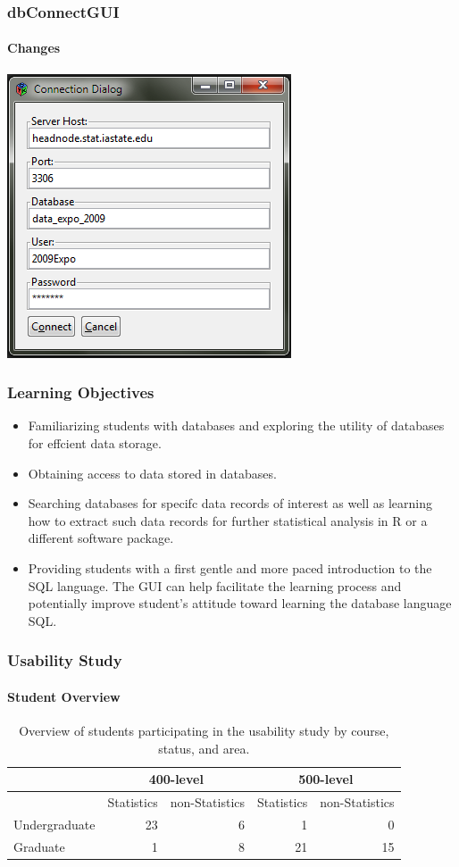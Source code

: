 \documentclass[xcolor=dvipsnames]{beamer}
\begin{document}
\begin{frame}
  \frametitle{dbConnectGUI}
  \framesubtitle{Changes}
  \centering
  \includegraphics[width=.50\linewidth]{./images/db-ConnectNew.png}

\end{frame}

\begin{frame}
  \frametitle{Learning Objectives}
	
	\begin{itemize}
	\item Familiarizing students with databases and exploring the utility of databases for effcient data storage.
	\item Obtaining access to data stored in databases.
	\item Searching databases for specifc data records of interest as well as learning how to extract such data records for further statistical analysis in R or a different software package.
	\item Providing students with a first gentle and more paced introduction to the SQL language. The GUI can help facilitate the learning process and potentially improve student's attitude toward learning the database language SQL.
	\end{itemize}

\end{frame}

\begin{frame}
  \frametitle{Usability Study}
  \framesubtitle{Student Overview}


	\begin{table}[htbp]
	   \centering
	   \begin{tabular}{lrrrr} 
	      \hline
		  & \multicolumn{2}{c}{400-level} & \multicolumn{2}{c}{500-level}  \\
	      \hline
	      & Statistics & non-Statistics       & Statistics & non-Statistics \\
	       \hline
	      Undergraduate & 23 & 6 & 1 & 0 \\
	      Graduate & 1 & 8 & 21 & 15 \\
	      \hline
	   \end{tabular}
	   \caption{Overview of students participating in the usability study by course, status, and area.}
	   \label{fb-overview}
	\end{table}
\end{frame}
\end{document}
